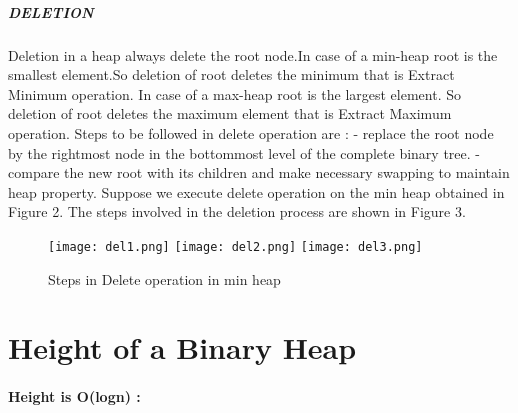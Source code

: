 \documentclass{amsart}
\theoremstyle{plain}
\numberwithin{equation}{section}
\begin{document}
\subparagraph{\textbf{DELETION}\newline}
Deletion in a heap always delete the root node.In case of a min-heap root is the smallest element.So deletion of root deletes the minimum that is Extract Minimum operation. In case of a max-heap root is the largest element. So deletion of root deletes the maximum element that is Extract Maximum operation.\newline\newline
Steps to be followed in delete operation are :\newline
\indent- replace the root node by the rightmost node in the bottommost level of the complete binary tree.\newline
\indent- compare the new root with its children and make necessary swapping to maintain heap property.\newline
Suppose we execute delete operation on the min heap obtained in Figure 2. The steps involved in the deletion process are shown in Figure 3.\newline\
 
\begin{figure}[h] \label{fig:png}
	\texttt{[image: del1.png]} \hspace{1in}
	\texttt{[image: del2.png]} \hspace{0.5in}
	\texttt{[image: del3.png]} \hspace{0.5in}  
	\caption{Steps in Delete operation in min heap}	
\end{figure}  


\section{Height of a Binary Heap\newline}

\paragraph{\textbf{Height is O(logn) :}\newline}
\end{document}
